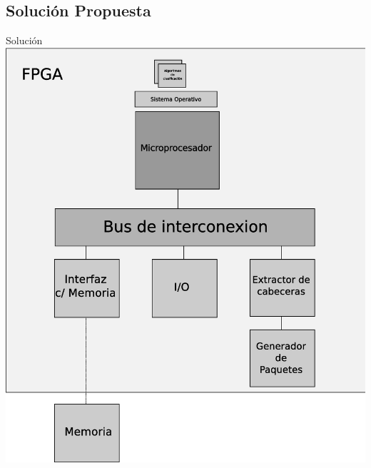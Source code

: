 \documentclass[xcolor=dvipsnames]{beamer}
\begin{document}
\subsection{Solución Propuesta}
\begin{frame}{Solución}
\center 
\includegraphics[scale=0.25]{figures/solucion.eps}

\end{frame}
\end{document}
